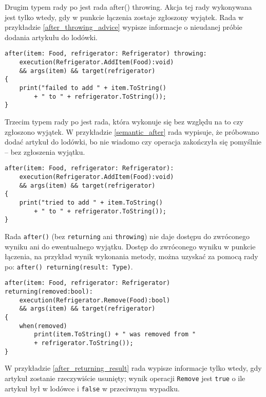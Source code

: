 \documentclass[a4paper,12pt]{mwbk}
\begin{document}
Drugim typem rady po jest rada after() throwing. Akcja tej rady wykonywana jest
tylko wtedy, gdy w punkcie łączenia zostaje zgłoszony wyjątek. Rada w
przykładzie \ref{after_throwing_advice} wypisze informacje o nieudanej próbie
dodania artykułu do lodówki.

\begin{lstlisting}[style=AspectJ,caption=Rada after throwing,label=after_throwing_advice]
after(item: Food, refrigerator: Refrigerator) throwing: 
    execution(Refrigerator.AddItem(Food):void) 
    && args(item) && target(refrigerator) 
{
    print("failed to add " + item.ToString() 
        + " to " + refrigerator.ToString());
}
\end{lstlisting}

Trzecim typem rady po jest rada, która wykonuje się bez względu na to czy
zgłoszono wyjątek.  W przykładzie \ref{semantic_after} rada wypisuje, że
próbowano dodać artykuł do lodówki, bo nie wiadomo czy operacja zakończyła się
pomyślnie -- bez zgłoszenia wyjątku.

\begin{lstlisting}[style=AspectJ,caption=Rada after,label=after_throwing_advice]
after(item: Food, refrigerator: Refrigerator): 
    execution(Refrigerator.AddItem(Food):void) 
    && args(item) && target(refrigerator) 
{
    print("tried to add " + item.ToString() 
        + " to " + refrigerator.ToString());
}
\end{lstlisting}

Rada \lstinline!after()! (bez \lstinline!returning! ani \lstinline!throwing!)
nie daje dostępu do zwróconego wyniku ani do ewentualnego wyjątku. Dostęp do
zwróconego wyniku w punkcie łączenia, na przykład wynik wykonania metody, można
uzyskać za pomocą rady po: \lstinline!after() returning(result: Type)!.

\begin{lstlisting}[style=AspectJ,caption=Dostęp do wyniku metody,label=after_returning_result]
after(item: Food, refrigerator: Refrigerator) 
returning(removed:bool): 
    execution(Refrigerator.Remove(Food):bool) 
    && args(item) && target(refrigerator) 
{
    when(removed)
        print(item.ToString() + " was removed from " 
        + refrigerator.ToString());
}
\end{lstlisting}

W przykładzie \ref{after_returning_result} rada wypisze informacje tylko wtedy,
gdy artykuł zostanie rzeczywiście usunięty; wynik operacji \lstinline!Remove!
jest \lstinline!true! o ile artykuł był w lodówce i \lstinline!false! w
przeciwnym wypadku.
\end{document}
